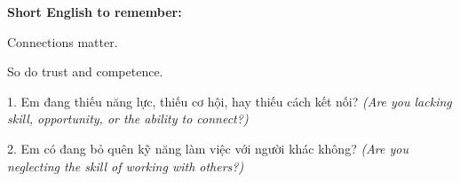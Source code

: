 \begin{ghinhoanh}
\textbf{Short English to remember:}

Connections matter.

So do trust and competence.
\end{ghinhoanh}

\begin{tuhocnhanh}
1. Em đang thiếu năng lực, thiếu cơ hội, hay thiếu cách kết nối? \textit{(Are you lacking skill, opportunity, or the ability to connect?)}

2. Em có đang bỏ quên kỹ năng làm việc với người khác không? \textit{(Are you neglecting the skill of working with others?)}
\end{tuhocnhanh}
\ngancach